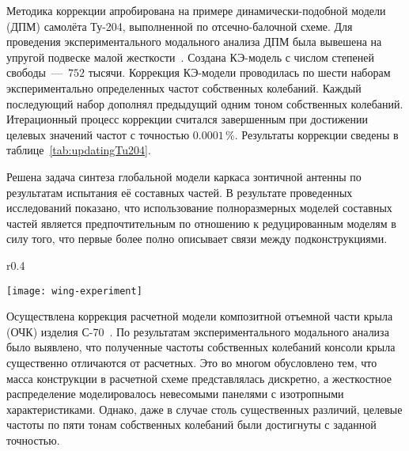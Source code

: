 Методика коррекции апробирована на примере динамически-подобной модели (ДПМ) самолёта \mbox{Ту-204}, выполненной по отсечно-балочной схеме. Для проведения экспериментального модального анализа ДПМ была вывешена на упругой подвеске малой жесткости~. Создана КЭ-модель  с числом степеней свободы~---~$ 752 $ тысячи. Коррекция КЭ-модели проводилась по шести наборам экспериментально определенных частот собственных колебаний. Каждый последующий набор дополнял предыдущий одним тоном собственных колебаний. Итерационный процесс коррекции считался завершенным при достижении целевых значений частот с точностью $0.0001$\,\%. Результаты коррекции сведены в таблице~\ref{tab:updatingTu204}. 

Решена задача синтеза глобальной модели каркаса зонтичной антенны по результатам испытания её составных частей. В результате проведенных исследований показано, что использование полноразмерных моделей составных частей является предпочтительным по отношению к редуцированным моделям в силу того, что первые более полно описывает связи между подконструкциями.

\begin{wrapfigure}[12]{r}{0.4\textwidth}
	\begin{center}
		\vspace{-4em}
		\texttt{[image: wing-experiment]} 
		 \label{fig:wing-experiment}
	\end{center}
\end{wrapfigure}

Осуществлена коррекция расчетной модели композитной отъемной части крыла (ОЧК) изделия \mbox{С-70}~. По результатам экспериментального модального анализа было выявлено, что полученные частоты собственных колебаний консоли крыла существенно отличаются от расчетных. Это во многом обусловлено тем, что масса конструкции в расчетной схеме представлялась дискретно, а жесткостное распределение моделировалось невесомыми панелями с изотропными характеристиками. Однако, даже в случае столь существенных различий, целевые частоты по пяти тонам собственных колебаний были достигнуты с заданной точностью. 

